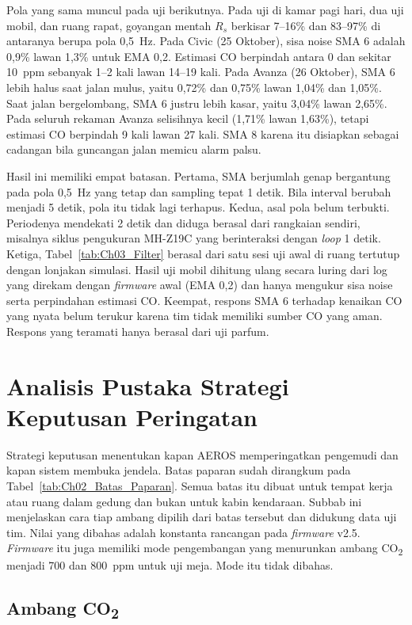     Pola yang sama muncul pada uji berikutnya. Pada uji di kamar pagi hari, dua uji mobil, dan ruang rapat, goyangan mentah $R_s$ berkisar 7--16\% dan 83--97\% di antaranya berupa pola 0,5~Hz. Pada Civic (25 Oktober), sisa noise SMA 6 adalah 0,9\% lawan 1,3\% untuk EMA 0,2. Estimasi CO berpindah antara 0 dan sekitar 10~ppm sebanyak 1--2 kali lawan 14--19 kali. Pada Avanza (26 Oktober), SMA 6 lebih halus saat jalan mulus, yaitu 0,72\% dan 0,75\% lawan 1,04\% dan 1,05\%. Saat jalan bergelombang, SMA 6 justru lebih kasar, yaitu 3,04\% lawan 2,65\%. Pada seluruh rekaman Avanza selisihnya kecil (1,71\% lawan 1,63\%), tetapi estimasi CO berpindah 9 kali lawan 27 kali. SMA 8 karena itu disiapkan sebagai cadangan bila guncangan jalan memicu alarm palsu.

    Hasil ini memiliki empat batasan. Pertama, SMA berjumlah genap bergantung pada pola 0,5~Hz yang tetap dan sampling tepat 1 detik. Bila interval berubah menjadi 5 detik, pola itu tidak lagi terhapus. Kedua, asal pola belum terbukti. Periodenya mendekati 2 detik dan diduga berasal dari rangkaian sendiri, misalnya siklus pengukuran MH-Z19C yang berinteraksi dengan \textit{loop} 1 detik. Ketiga, Tabel~\ref{tab:Ch03_Filter} berasal dari satu sesi uji awal di ruang tertutup dengan lonjakan simulasi. Hasil uji mobil dihitung ulang secara luring dari log yang direkam dengan \textit{firmware} awal (EMA 0,2) dan hanya mengukur sisa noise serta perpindahan estimasi CO. Keempat, respons SMA 6 terhadap kenaikan CO yang nyata belum terukur karena tim tidak memiliki sumber CO yang aman. Respons yang teramati hanya berasal dari uji parfum.
\section{Analisis Pustaka Strategi Keputusan Peringatan}
\label{sec:Analisis_Strategi_Peringatan}

    Strategi keputusan menentukan kapan AEROS memperingatkan pengemudi dan kapan sistem membuka jendela. Batas paparan sudah dirangkum pada Tabel~\ref{tab:Ch02_Batas_Paparan}. Semua batas itu dibuat untuk tempat kerja atau ruang dalam gedung dan bukan untuk kabin kendaraan. Subbab ini menjelaskan cara tiap ambang dipilih dari batas tersebut dan didukung data uji tim. Nilai yang dibahas adalah konstanta rancangan pada \textit{firmware} v2.5. \textit{Firmware} itu juga memiliki mode pengembangan yang menurunkan ambang CO\textsubscript{2} menjadi 700 dan 800~ppm untuk uji meja. Mode itu tidak dibahas.

    \subsection{Ambang CO\texorpdfstring{\textsubscript{2}}{2}}
    \label{sec:Ambang_CO2}

